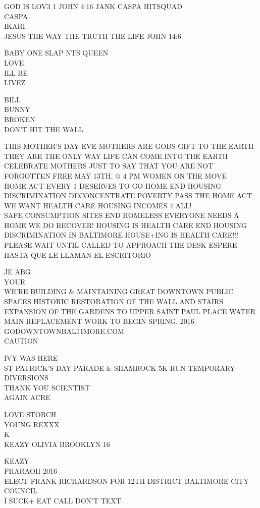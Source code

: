 \documentclass[10pt,letterpaper]{article}
\begin{document}
GOD IS LOV3 1 JOHN 4:16 JANK CASPA HITSQUAD\\
CASPA\\
IKARI\\
JESUS THE WAY THE TRUTH THE LIFE JOHN 14:6

BABY ONE SLAP NTS QUEEN\\
LOVE\\
ILL BE\\
LIVEZ

BILL\\
BUNNY\\
BROKEN\\
DON'T HIT THE WALL

THIS MOTHER'S DAY EVE MOTHERS ARE GODS GIFT TO THE EARTH THEY ARE THE ONLY WAY LIFE CAN COME INTO THE EARTH CELEBRATE MOTHERS JUST TO SAY THAT YOU ARE NOT FORGOTTEN FREE MAY 13TH, @ 4 PM WOMEN ON THE MOVE\\
HOME ACT EVERY 1 DESERVES TO GO HOME END HOUSING DISCRIMINATION DECONCENTRATE POVERTY PASS THE HOME ACT WE WANT HEALTH CARE HOUSING INCOMES 4 ALL!\\
SAFE CONSUMPTION SITES END HOMELESS EVERYONE NEEDS A HOME WE DO RECOVER!  HOUSING IS HEALTH CARE END HOUSING DISCRIMINATION IN BALTIMORE HOUSE+ING IS HEALTH CARE!!!\\
PLEASE WAIT UNTIL CALLED TO APPROACH THE DESK ESPERE HASTA QUE LE LLAMAN EL ESCRITORIO

JE ABG\\
YOUR\\
WE'RE BUILDING \& MAINTAINING GREAT DOWNTOWN PUBLIC SPACES HISTORIC RESTORATION OF THE WALL AND STAIRS EXPANSION OF THE GARDENS TO UPPER SAINT PAUL PLACE WATER MAIN REPLACEMENT WORK TO BEGIN SPRING, 2016 GODOWNTOWNBALTIMORE.COM\\
CAUTION

IVY WAS HERE\\
ST PATRICK'S DAY PARADE \& SHAMROCK 5K RUN TEMPORARY DIVERSIONS\\
THANK YOU SCIENTIST\\
AGAIN ACRE

LOVE STORCH\\
YOUNG REXXX\\
K\\
KEAZY OLIVIA BROOKLYN 16

KEAZY\\
PHARAOH 2016\\
ELECT FRANK RICHARDSON FOR 12TH DISTRICT BALTIMORE CITY COUNCIL\\
I SUCK+ EAT CALL DON'T TEXT
\end{document}
